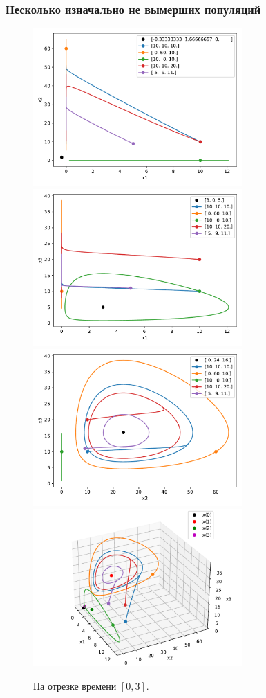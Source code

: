     \subsubsection{Несколько изначально не вымерших популяций}
    \begin{figure}[H]
        \centering
        \includegraphics[width=8cm]{pictures/x_12phase.pdf}
        \includegraphics[width=8cm]{pictures/x_13phase.pdf}
        \includegraphics[width=8cm]{pictures/x_23phase.pdf}
        \includegraphics[width=8cm]{pictures/x_phase3.pdf}
        \caption{На отрезке времени \( [0, 3] \).}
    \end{figure}
